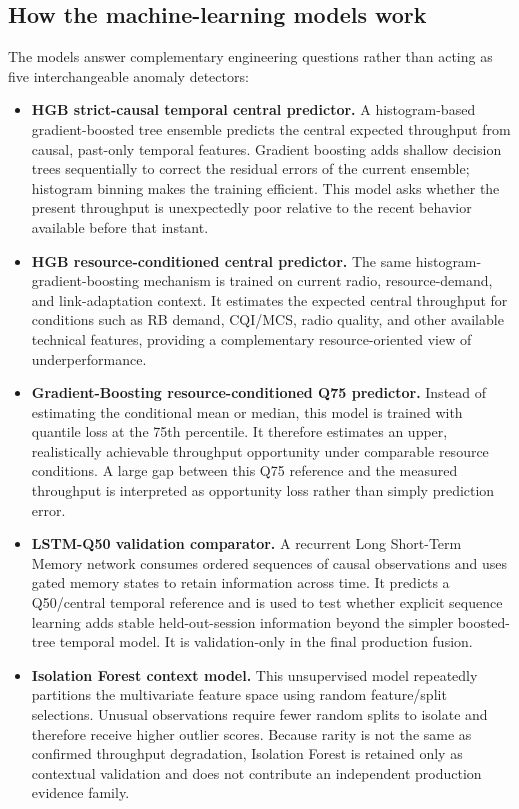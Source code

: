 \subsection{How the machine-learning models work}

The models answer complementary engineering questions rather than acting as five interchangeable anomaly detectors:
\begin{itemize}
  \item \textbf{HGB strict-causal temporal central predictor.} A histogram-based gradient-boosted tree ensemble predicts the central expected throughput from causal, past-only temporal features. Gradient boosting adds shallow decision trees sequentially to correct the residual errors of the current ensemble; histogram binning makes the training efficient. This model asks whether the present throughput is unexpectedly poor relative to the recent behavior available before that instant.

  \item \textbf{HGB resource-conditioned central predictor.} The same histogram-gradient-boosting mechanism is trained on current radio, resource-demand, and link-adaptation context. It estimates the expected central throughput for conditions such as RB demand, CQI/MCS, radio quality, and other available technical features, providing a complementary resource-oriented view of underperformance.

  \item \textbf{Gradient-Boosting resource-conditioned Q75 predictor.} Instead of estimating the conditional mean or median, this model is trained with quantile loss at the 75th percentile. It therefore estimates an upper, realistically achievable throughput opportunity under comparable resource conditions. A large gap between this Q75 reference and the measured throughput is interpreted as opportunity loss rather than simply prediction error.

  \item \textbf{LSTM-Q50 validation comparator.} A recurrent Long Short-Term Memory network consumes ordered sequences of causal observations and uses gated memory states to retain information across time. It predicts a Q50/central temporal reference and is used to test whether explicit sequence learning adds stable held-out-session information beyond the simpler boosted-tree temporal model. It is validation-only in the final production fusion.

  \item \textbf{Isolation Forest context model.} This unsupervised model repeatedly partitions the multivariate feature space using random feature/split selections. Unusual observations require fewer random splits to isolate and therefore receive higher outlier scores. Because rarity is not the same as confirmed throughput degradation, Isolation Forest is retained only as contextual validation and does not contribute an independent production evidence family.
\end{itemize}

